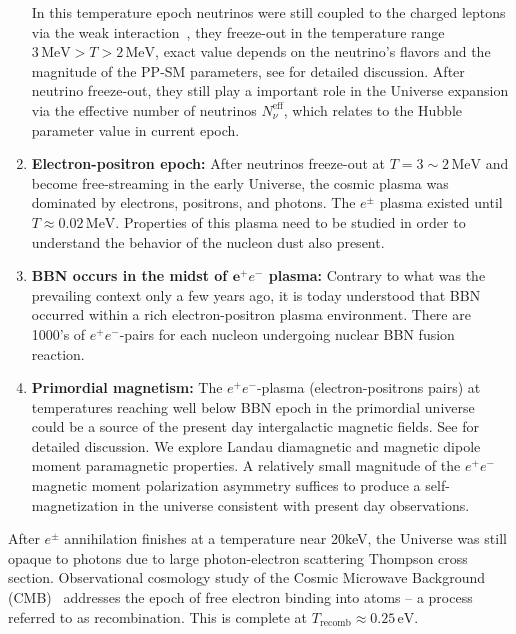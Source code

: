 \begin{enumerate}
In this temperature epoch neutrinos were still coupled to the charged leptons via the weak interaction~\cite{Birrell:2012gg,Birrell:2014ona}, they freeze-out in the temperature range $3\,\mathrm{MeV}>T>2\,\mathrm{MeV}$, exact value depends on the neutrino's flavors and the magnitude of the PP-SM parameters, see  for detailed discussion. After neutrino freeze-out, they still play a important role in the Universe expansion via the effective number of neutrinos $N_{\nu}^{\mathrm{eff}}$, which relates to  the Hubble parameter value in current epoch.
%
\item \textbf{Electron-positron epoch:}  After neutrinos freeze-out at $T=3\sim2\,\mathrm{MeV}$ and become free-streaming in the early Universe, the cosmic plasma was dominated by electrons, positrons, and photons. The $e^\pm$ plasma existed until $T\approx 0.02\,\mathrm{MeV}$. Properties of this plasma need to be studied in order to understand the behavior of the nucleon dust also present.
%
\item \textbf{BBN occurs in the midst of ${\mathbf e^+e^-}$ plasma:} Contrary to what was the prevailing context only a few years ago, it is today understood that BBN occurred within a rich electron-positron plasma environment. There are 1000's of ${ e^+e^-}$-pairs for each nucleon undergoing nuclear BBN fusion reaction. 
%
\item \textbf{Primordial magnetism:} The $e^{+}e^{-}$-plasma (electron-positrons pairs) at temperatures reaching well below BBN epoch in the primordial universe could be a source of the present day intergalactic magnetic fields. See  for detailed discussion. We explore Landau diamagnetic and magnetic dipole moment paramagnetic properties. A relatively small magnitude of the $e^{+}e^{-}$ magnetic moment polarization asymmetry suffices to produce a self-magnetization in the universe consistent with present day observations.
\end{enumerate}

After $e^\pm$ annihilation finishes at a temperature near 20keV, the Universe was still opaque to photons due to large photon-electron scattering Thompson cross section. Observational cosmology study of the Cosmic Microwave Background (CMB)~\cite{Planck:2018vyg} addresses the epoch of free electron binding into atoms -- a process referred to as recombination. This is complete at $T_\mathrm{recomb}\approx 0.25\,\mathrm{eV}$. 

